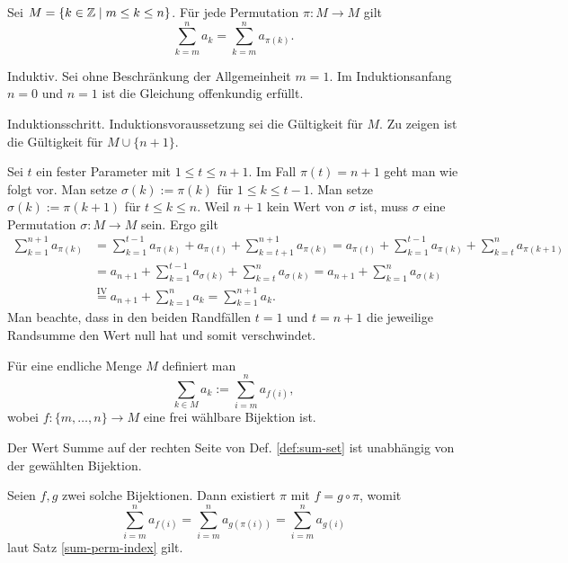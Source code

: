 \newpage
\begin{Satz}%
\label{sum-perm-index}\newlinefirst
Sei $M=\{k\in\mathbb Z\mid m\le k\le n\}$. Für jede Permutation $\pi\colon M\to M$ gilt
\[\sum_{k=m}^n a_k = \sum_{k=m}^n a_{\pi(k)}.\]
\end{Satz}
\begin{Beweis} Induktiv. Sei ohne Beschränkung der Allgemeinheit $m=1$.
Im Induktionsanfang $n=0$ und $n=1$ ist die Gleichung offenkundig erfüllt.

Induktionsschritt. Induktionsvoraussetzung sei die Gültigkeit für $M$.
Zu zeigen ist die Gültigkeit für $M\cup\{n+1\}$.

Sei $t$ ein fester Parameter mit $1\le t\le n+1$.
Im Fall $\pi(t) = n+1$ geht man wie folgt vor.
Man setze $\sigma(k):=\pi(k)$ für $1\le k\le t-1$. Man setze
$\sigma(k):=\pi(k+1)$ für $t\le k\le n$. Weil $n+1$ kein Wert von
$\sigma$ ist, muss $\sigma$ eine Permutation $\sigma\colon M\to M$ sein.
Ergo gilt
\begin{align*}
\sum_{k=1}^{n+1} a_{\pi(k)} &= \sum_{k=1}^{t-1} a_{\pi(k)}
+ a_{\pi(t)} + \sum_{k=t+1}^{n+1} a_{\pi(k)}
= a_{\pi(t)} + \sum_{k=1}^{t-1} a_{\pi(k)}
+ \sum_{k=t}^n a_{\pi(k+1)}\\
&= a_{n+1} + \sum_{k=1}^{t-1} a_{\sigma(k)}
+ \sum_{k=t}^n a_{\sigma(k)}
= a_{n+1} + \sum_{k=1}^n a_{\sigma(k)}\\
&\stackrel{\mathrm{IV}}= a_{n+1} + \sum_{k=1}^n a_k
= \sum_{k=1}^{n+1} a_k.
\end{align*}
Man beachte, dass in den beiden Randfällen $t=1$ und $t=n+1$ die
jeweilige Randsumme den Wert null hat und somit verschwindet.\,\qedsymbol
\end{Beweis}

\begin{Definition}\label{def:sum-set}
Für eine endliche Menge $M$ definiert man
\[\sum_{k\in M} a_k := \sum_{i=m}^n a_{f(i)},\]
wobei $f\colon \{m,\ldots,n\}\to M$ eine frei wählbare Bijektion ist.
\end{Definition}

\begin{Korollar}\label{sum-set-well-defined}
Der Wert Summe auf der rechten Seite von Def. \ref{def:sum-set}
ist unabhängig von der gewählten Bijektion.
\end{Korollar}
\begin{Beweis} Seien $f,g$ zwei solche Bijektionen. Dann existiert
$\pi$ mit $f=g\circ\pi$, womit%
\[\sum_{i=m}^n a_{f(i)} = \sum_{i=m}^n a_{g(\pi(i))} =
\sum_{i=m}^n a_{g(i)}\]
laut Satz \ref{sum-perm-index} gilt.\,\qedsymbol
\end{Beweis}

